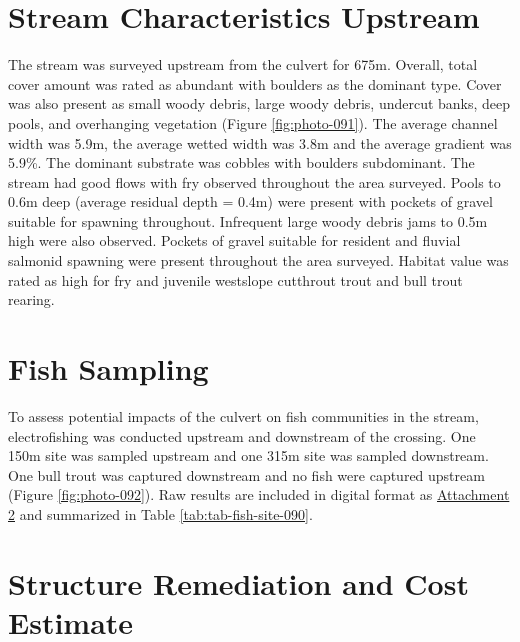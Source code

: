 \documentclass[
]{book}
\begin{document}
\hypertarget{stream-characteristics-upstream-3}{%
\section*{Stream Characteristics Upstream}\label{stream-characteristics-upstream-3}}

The stream was surveyed upstream from the culvert for 675m. Overall, total cover amount was rated as abundant with boulders as the dominant type. Cover was also present as small woody debris, large woody debris, undercut banks, deep pools, and overhanging vegetation (Figure \ref{fig:photo-091}). The average channel width was 5.9m, the average wetted width was 3.8m and the average gradient was 5.9\%. The dominant substrate was cobbles with boulders subdominant. The stream had good flows with fry observed throughout the area surveyed. Pools to 0.6m deep (average residual depth = 0.4m) were present with pockets of gravel suitable for spawning throughout. Infrequent large woody debris jams to 0.5m high were also observed. Pockets of gravel suitable for resident and fluvial salmonid spawning were present throughout the area surveyed. Habitat value was rated as high for fry and juvenile westslope cutthrout trout and bull trout rearing.

\hypertarget{fish-sampling-2}{%
\section*{Fish Sampling}\label{fish-sampling-2}}

To assess potential impacts of the culvert on fish communities in the stream, electrofishing was conducted upstream and downstream of the crossing. One 150m site was sampled upstream and one 315m site was sampled downstream. One bull trout was captured downstream and no fish were captured upstream (Figure \ref{fig:photo-092}). Raw results are included in digital format as \href{https://github.com/NewGraphEnvironment/fish_passage_elk_2020_reporting/raw/master/data/habitat_confirmations.xls}{Attachment 2} and summarized in Table \ref{tab:tab-fish-site-090}.

\hypertarget{structure-remediation-and-cost-estimate-3}{%
\section*{Structure Remediation and Cost Estimate}\label{structure-remediation-and-cost-estimate-3}}
\end{document}
